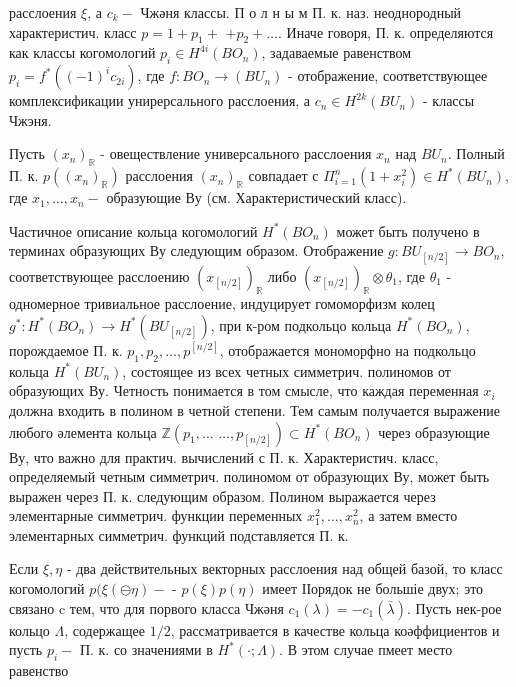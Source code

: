 \documentclass[10pt]{article}
\begin{document}
расслоения $\xi$, а $c_{k}-$ Чжәня классы. П о л н ы м П. к. наз. неоднородный характеристич. класс $p=1+p_{1}+$ $+p_{2}+\ldots$. Иначе говоря, П. к. определяются как классы когомологий $p_{i} \in H^{4 i}\left(B O_{n}\right)$, задаваемые равенством $p_{i}=f^{*}\left((-1)^{i} c_{2 i}\right)$, где $f: B O_{n} \rightarrow\left(B U_{n}\right)$ - отображение, соответствующее комплексификации унирерсального расслоения, а $c_{n} \in H^{2 k}\left(B U_{n}\right)$ - классы Чжэня.



Пусть $\left(x_{n}\right)_{\mathbb{R}}$ - овеществление универсального расслоения $x_{n}$ над $B U_{n}$. Полный П. к. $p\left(\left(x_{n}\right)_{\mathbb{R}}\right)$ расслоения $\left(x_{n}\right)_{\mathbb{R}}$ совпадает с $\Pi_{i=1}^{n}\left(1+x_{i}^{2}\right) \in H^{*}\left(B U_{n}\right)$, где $x_{1}, \ldots, x_{n}-$ образующие Ву (см. Характеристический класс).



Частичное описание кольца когомологий $H^{*}\left(B O_{n}\right)$ может быть получено в терминах образующих Ву следующим образом. Отображение $g: B U_{[n / 2]} \rightarrow B O_{n}$, соответствующее расслоению $\left(x_{[n / 2]}\right)_{\mathbb{R}}$ либо $\left(x_{[n / 2]}\right)_{\mathbb{R}} \otimes \theta_{1}$, где $\theta_{1}$ - одномерное тривиальное расслоение, индуцирует гомоморфизм колец $g^{*}: H^{*}\left(B O_{n}\right) \rightarrow H^{*}\left(B U_{[n / 2]}\right)$, при к-ром подкольцо кольца $H^{*}\left(B O_{n}\right)$, порождаемое П. к. $p_{1}, p_{2}, \ldots, p^{[n / 2]}$, отображается мономорфно на подкольцо кольца $H^{*}\left(B U_{n}\right)$, состоящее из всех четных симметрич. полиномов от образующих Ву. Четность понимается в том смысле, что каждая переменная $x_{i}$ должна входить в полином в четной степени. Тем самым получается выражение любого әлемента кольца $\mathbb{Z}\left(p_{1}, \ldots\right.$ $\left.\ldots, p_{[n / 2]}\right) \subset H^{*}\left(B O_{n}\right)$ через образующие Ву, что важно для практич. вычислений с П. к. Характеристич. класс, определяемый четным симметрич. полиномом от образующих Ву, может быть выражен через П. к. следующим образом. Полином выражается через элементарные симметрич. функции переменных $x_{1}^{2}, \ldots, x_{n}^{2}$, а затем вместо элементарных симметрич. функций подставляется П. к.



Если $\xi, \eta$ - два действительных векторных расслоения над общей базой, то класс когомологий $p(\xi(\ominus \eta)-$ - $p(\xi) p(\eta)$ имеет ІІорядок не большіе двух; это связано c тем, что для порвого класса Чжәня $c_{1}(\lambda)=-c_{1}(\bar{\lambda})$. Пусть нек-рое кольцо $\Lambda$, содержащее $1 / 2$, рассматривается в качестве кольца коәффициентов и пусть $p_{i}-$ П. к. со значениями в $H^{*}(\cdot ; \Lambda)$. В этом случае пмеет место равенство
\end{document}
